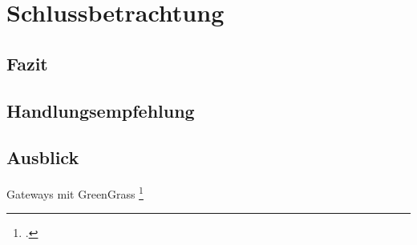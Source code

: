\chapter{Schlussbetrachtung}

\section{Fazit}

\section{Handlungsempfehlung}

\section{Ausblick}

Gateways mit GreenGrass \footcite[][]{Shankar.2020}
